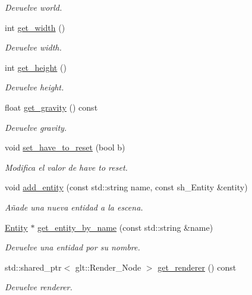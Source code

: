 \begin{DoxyCompactItemize}
\begin{DoxyCompactList}\small\item\em Devuelve world. \end{DoxyCompactList}\item 
int \mbox{\hyperlink{classexample_1_1_scene_ac29a51e28d223428f95a23b48bc02710}{get\+\_\+width}} ()
\begin{DoxyCompactList}\small\item\em Devuelve width. \end{DoxyCompactList}\item 
int \mbox{\hyperlink{classexample_1_1_scene_a3ff2b375c40031835ed6f94910f74094}{get\+\_\+height}} ()
\begin{DoxyCompactList}\small\item\em Devuelve height. \end{DoxyCompactList}\item 
float \mbox{\hyperlink{classexample_1_1_scene_a39dd7f357b227855409fd54fc73025ce}{get\+\_\+gravity}} () const
\begin{DoxyCompactList}\small\item\em Devuelve gravity. \end{DoxyCompactList}\item 
void \mbox{\hyperlink{classexample_1_1_scene_aef7c8aa7d2e11e950af439b8e5a45e1d}{set\+\_\+have\+\_\+to\+\_\+reset}} (bool b)
\begin{DoxyCompactList}\small\item\em Modifica el valor de have to reset. \end{DoxyCompactList}\item 
void \mbox{\hyperlink{classexample_1_1_scene_a2d5d63db1f3b6f1b2c50d4c8f9a9a214}{add\+\_\+entity}} (const std\+::string name, const sh\+\_\+\+Entity \&entity)
\begin{DoxyCompactList}\small\item\em Añade una nueva entidad a la escena. \end{DoxyCompactList}\item 
\mbox{\hyperlink{classexample_1_1_entity}{Entity}} $\ast$ \mbox{\hyperlink{classexample_1_1_scene_a152fd318698a4fc4fbf40d865cc7683a}{get\+\_\+entity\+\_\+by\+\_\+name}} (const std\+::string \&name)
\begin{DoxyCompactList}\small\item\em Devuelve una entidad por su nombre. \end{DoxyCompactList}\item 
std\+::shared\+\_\+ptr$<$ glt\+::\+Render\+\_\+\+Node $>$ \mbox{\hyperlink{classexample_1_1_scene_a573c73dc4d15f6b08212c297c91c79e3}{get\+\_\+renderer}} () const
\begin{DoxyCompactList}\small\item\em Devuelve renderer. \end{DoxyCompactList}\end{DoxyCompactItemize}



